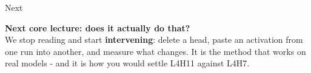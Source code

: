 \documentclass[aspectratio=169]{beamer}
\newcommand{\takebox}[1]{%
  \begin{tcolorbox}[colback=paramgreen!8, colframe=paramgreen, boxrule=0.6pt, arc=2pt]
  #1
  \end{tcolorbox}}
\begin{document}
\begin{frame}{Next}
  \vspace{1.2em}
  \takebox{\textbf{Next core lecture: does it actually do that?}\\[0.6em]
  We stop reading and start \textbf{intervening}: delete a head, paste an activation from one run
  into another, and measure what changes. It is the method that works on real models - and it is
  how you would settle L4H11 against L4H7.}
\end{frame}
\end{document}
